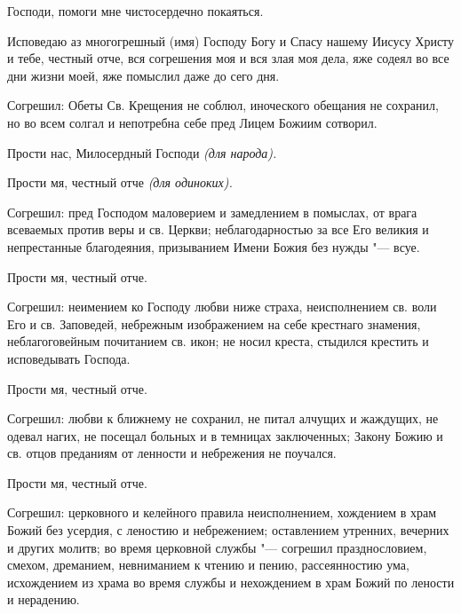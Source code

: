 \bigskip\bigskip\mychapterending

 


Господи, помоги мне чистосердечно покаяться. 


\bigskip\bigskip\mychapterending

 
Исповедаю аз многогрешный (имя) Господу Богу и Спасу нашему Иисусу Христу и тебе, честный отче, вся согрешения моя и вся злая моя дела, яже содеял во все дни жизни моей, яже помыслил даже до сего дня. 



Согрешил: Обеты Св. Крещения не соблюл, иноческого обещания не сохранил, но во всем солгал и непотребна себе пред Лицем Божиим сотворил. 



Прости нас, Милосердный Господи \itshape (для народа).

\normalfont{}Прости мя, честный отче \itshape (для одиноких).\normalfont{} 



Согрешил: пред Господом маловерием и замедлением в помыслах, от врага всеваемых против веры и св. Церкви; неблагодарностью за все Его великия и непрестанные благодеяния, призыванием Имени Божия без нужды "--- всуе. 



Прости мя, честный отче. 



Согрешил: неимением ко Господу любви ниже страха, неисполнением св. воли Его и св. Заповедей, небрежным изображением на себе крестнаго знамения, неблагоговейным почитанием св. икон; не носил креста, стыдился крестить и исповедывать Господа. 



Прости мя, честный отче. 



Согрешил: любви к ближнему не сохранил, не питал алчущих и жаждущих, не одевал нагих, не посещал больных и в темницах заключенных; Закону Божию и св. отцов преданиям от ленности и небрежения не поучался. 



Прости мя, честный отче. 



Согрешил: церковного и келейного правила неисполнением, хождением в храм Божий без усердия, с леностию и небрежением; оставлением утренних, вечерних и других молитв; во время церковной службы "--- согрешил празднословием, смехом, дреманием, невниманием к чтению и пению, рассеянностию ума, исхождением из храма во время службы и нехождением в храм Божий по лености и нерадению. 



